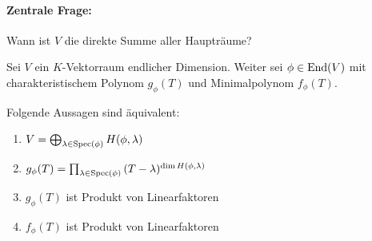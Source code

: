\documentclass[parskip,a4paper,twoside,DIV15,BCOR12mm]{scrbook}
\begin{document}
\paragraph{Zentrale Frage:}{
    Wann ist \(V\) die direkte Summe aller Haupträume?}
\begin{theo}
\label{Satz 14.3}
Sei \(V\) ein \(K\)-Vektorraum endlicher Dimension. Weiter sei 
\(\phi\in\operatorname{End}(V)\) mit charakteristischem Polynom \(g_{\phi}(T)\) und
Minimalpolynom \(f_{\phi}(T)\).

Folgende Aussagen sind äquivalent:
\begin{enumerate}
\item \(V=\bigoplus_{\lambda\in\operatorname{Spec}(\phi)}{H(\phi,\lambda)}\)
\label{Satz 14.3 Beh 1}
\item \(g_{\phi}(T)=
    \prod_{\lambda\in\operatorname{Spec}(\phi)}{(T-\lambda)^{\dim H(\phi,\lambda)}}\)
\label{Satz 14.3 Beh 2}
\item \(g_{\phi}(T)\) ist Produkt von Linearfaktoren
\label{Satz 14.3 Beh 3}
\item \(f_{\phi}(T)\) ist Produkt von Linearfaktoren
\label{Satz 14.3 Beh 4}
\end{enumerate}
\end{theo}
\end{document}
